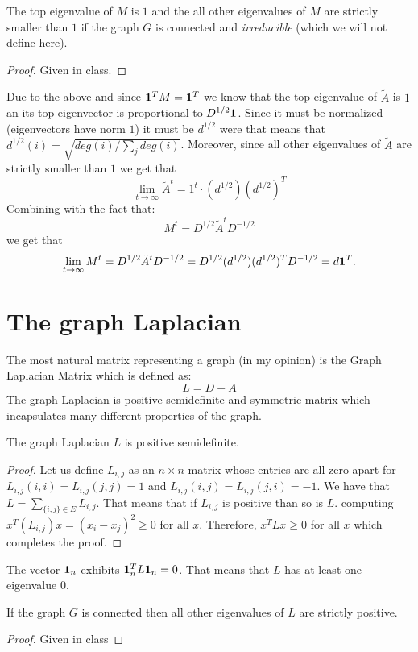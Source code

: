 \documentclass{article}
\begin{document}
\begin{fact}\label{asdfg}
The top eigenvalue of $M$ is $1$ and the all other eigenvalues of $M$ are strictly smaller than $1$ if the graph $G$ is 
connected and {\it irreducible} (which we will not define here).  
\end{fact}
\begin{proof}
Given in class.
\end{proof}

Due to the above and since $\mathbf{1}^TM = \mathbf{1}^T$ we know that the top eigenvalue of $\tilde{A}$ is $1$ an its top eigenvector is proportional to $D^{1/2}\mathbf{1}$. Since it must be normalized (eigenvectors have norm $1$) it must be $d^{1/2}$ were that means that $d^{1/2}(i) = \sqrt{deg(i)/\sum_{j}deg(i)}$.
Moreover, since all other eigenvalues of $\tilde{A}$ are strictly smaller than $1$ we get that 
\[
\lim_{t \rightarrow \infty} \tilde{A}^t = 1^t \cdot (d^{1/2})(d^{1/2})^T
\]
Combining with the fact that:
\[
M^t = D^{1/2}\tilde{A}^t D^{-1/2}
\]
we get that 
\[
\lim_{t \rightarrow \infty} M^t = D^{1/2}\tilde{A}^t D^{-1/2} =  D^{1/2} (d^{1/2})(d^{1/2})^T D^{-1/2} = d \mathbf{1}^T.
\]

\section{The graph Laplacian}

The most natural matrix representing a graph (in my opinion) is the Graph Laplacian Matrix which is defined as:
\[
L = D - A
\]
The graph Laplacian is positive semidefinite and symmetric matrix which incapsulates many different properties of the graph.
\begin{fact}
The graph Laplacian $L$ is positive semidefinite.
\end{fact}
\begin{proof}
Let us define $L_{i,j}$ as an $n \times n$ matrix whose entries are all zero apart for $L_{i,j}(i,i) = L_{i,j}(j,j) =1$ and  $L_{i,j}(i,j) = L_{i,j}(j,i) = -1$.
We have that $L = \sum_{\{i,j\} \in E} L_{i,j}$. That means that if $L_{i,j}$ is positive than so is $L$.
computing $x^T(L_{i,j})x  = (x_i - x_j)^2 \ge 0$ for all $x$. Therefore,  $x^T L x \ge 0$ for all $x$ which completes the proof.
\end{proof}

The vector $\mathbf{1}_n$ exhibits $\mathbf{1}_n^T L \mathbf{1}_n = 0$. 
That means that $L$ has at least one eigenvalue $0$. 

\begin{fact}
If the graph $G$ is connected then all other eigenvalues of $L$ are strictly positive.
\end{fact}
\begin{proof}
Given in class
\end{proof}
\end{document}
